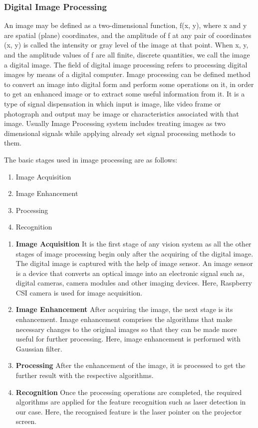 \documentclass[12pt, a4paper]{article}
\begin{document}
\subsubsection{Digital Image Processing}
An image may be defined as a two-dimensional function, f(x, y), where x and y are spatial (plane) coordinates, and the amplitude of f at any pair of coordinates (x, y) is called the intensity or gray level of the image at that point. When x, y, and the amplitude values of f are all finite, discrete quantities, we call the image a digital image. The field of digital image processing refers to processing digital images by means of a digital computer.
Image processing can be defined method to convert an image into digital form and perform some operations on it, in order to get an enhanced image or to extract some useful information from it. It is a type of signal dispensation in which input is image, like video frame or photograph and output may be image or characteristics associated with that image. Usually Image Processing system includes treating images as two dimensional signals while applying already set signal processing methods to them.~\cite{raf}

The basic stages used in image processing are as follows:
\begin{enumerate}
\item Image Acquisition
\item Image Enhancement
\item Processing
\item Recognition
\end{enumerate}

\begin{enumerate}
\item \textbf{Image Acquisition}
It is the first stage of any vision system as all the other stages of image processing begin only after the acquiring of the digital image. The digital image is captured with the help of image sensor. An image sensor is a device that converts an optical image into an electronic signal such as, digital cameras, camera modules and other imaging devices. Here, Raspberry CSI camera is used for image acquisition.

\item \textbf{Image Enhancement}
After acquiring the image, the next stage is its enhancement. Image enhancement comprises the algorithms that make necessary changes to the original images so that they can be made more useful for further processing. Here, image enhancement is performed with Gaussian filter.

\item \textbf{Processing}
After the enhancement of the image, it is processed to get the further result with the respective algorithms.

\item \textbf{Recognition}
Once the  processing operations are completed, the required algorithms are applied for the feature recognition such as laser detection in our case. Here, the recognised feature is the laser pointer on the projector screen.
\end{enumerate}
\end{document}
